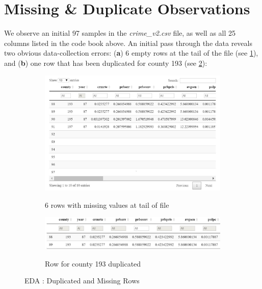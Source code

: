 
%
%
\section{Missing \& Duplicate Observations}
\label{sec:EDA}

We observe an initial 97 samples in the \textit{crime\_v2.csv} file, as well as all 25 columns listed in the code book above.  An initial pass through the data reveals two obvious data-collection errors: (\textbf{a}) 6 empty rows at the tail of the file (see \ref{fig:Empty Rows}), and (\textbf{b}) one row that has been duplicated for county 193 (see \ref{fig:Duplicate Row}): \\

\begin{figure}[!ht]
	\begin{subfigure}[b]{1.0\textwidth}
		\centering
		\caption{6 rows with missing values at tail of file}
		\includegraphics[width=\linewidth]{images/EDA_empty_rows.jpg}
		\label{fig:Empty Rows}
	\end{subfigure}\vspace{3mm}%
	\hfill
	
	\begin{subfigure}[b]{1.0\textwidth}
		\centering
		\caption{Row for county 193 duplicated}
		\includegraphics[width=\linewidth]{images/EDA_duplicate_rows.jpg}
		\label{fig:Duplicate Row}
	\end{subfigure}
	\label{fig:EDA Duplicate and Missing Rows}
	\caption{EDA : Duplicated and Missing Rows}
\end{figure}

